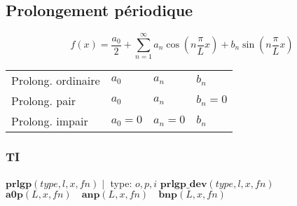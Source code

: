 \subsection{Prolongement périodique}
\begin{equation*}
  f(x) = \frac{a_0}{2} + \sum_{n=1}^{\infty} a_n \cos(n \frac{\pi}{L}x) +b_n \sin(n \frac{\pi}{L}x)
\end{equation*}

\begin{tabular}{llll}
    Prolong. ordinaire & \(a_0\) & \(a_n\) & \(b_n\)\\
    Prolong. pair & \(a_0\) & \(a_n\) & \(b_n=0\) \\
    Prolong. impair & \(a_0=0\) & \(a_n=0\) & \(b_n\)
\end{tabular}
\subsubsection{TI}
\(\mathbf{prlgp}(type,l,x,fn)\mid\) type: \(o,p,i\) \hfill\(\mathbf{prlgp\_dev}(type,l,x,fn)\)\\
\centering
\(
    \mathbf{a0p}(L,x,fn)\hspace{1em}    \mathbf{anp}(L,x,fn)\hspace{1em}    \mathbf{bnp}(L,x,fn) 
\)\\